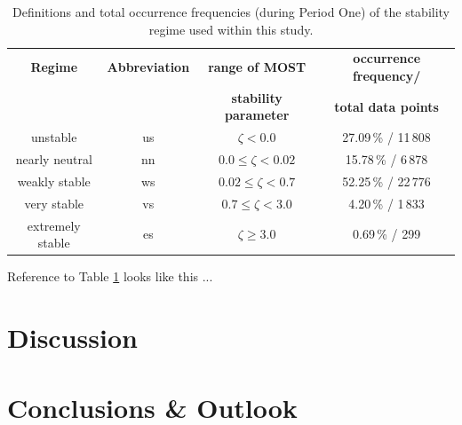 \documentclass[11pt,bibliography=totoc,openany,numbers=noendperiod]{scrbook}
\begin{document}
\begin{table}[htbp]
    \setlength\belowcaptionskip{1.5ex}
    \centering
    \caption[Stability regime definitions]{Definitions and total occurrence frequencies (during Period One) of the stability regime used within this study.}
    \label{john:table_stab_regimes}
    \begin{tabular}{|c|c|c|c|}
    \hline
    \textbf{Regime} & \textbf{Abbreviation} & \textbf{range of MOST} & \textbf{occurrence frequency/} \\
     & & \textbf{stability parameter} & \textbf{total data points} \\ \hline
    unstable & us & $\zeta < 0.0$ & 27.09\,\% / 11\,808 \\ \hline
    nearly neutral & nn & $0.0 \leq \zeta < 0.02$ & 15.78\,\% / 6\,878 \\ \hline
    weakly stable & ws & $0.02 \leq \zeta < 0.7$ & 52.25\,\% / 22\,776 \\ \hline
    very stable & vs & $0.7 \leq \zeta < 3.0$ & 4.20\,\% / 1\,833 \\ \hline
    extremely stable & es & $\zeta \geq 3.0$ & 0.69\,\% / 299 \\ \hline
    \end{tabular}
\end{table}

Reference to Table \ref{john:table_stab_regimes} looks like this ...


\section{Discussion}
\label{john:discussion}
\lipsum

\section{Conclusions \& Outlook}
\label{john:conclusion}
\lipsum

\vspace{3cm}




   
\end{document}

